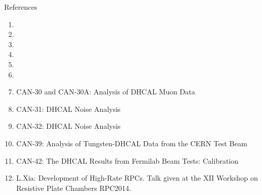 References
\begin{enumerate}
\item {}
\item {}
\item {}
\item {}
\item {}
\item {}
\item CAN-30 and CAN-30A: Analysis of DHCAL Muon Data
\item CAN-31: DHCAL Noise Analysis
\item CAN-32: DHCAL Noise Analysis
\item CAN-39: Analysis of Tungsten-DHCAL Data from the CERN Test Beam
\item CAN-42: The DHCAL Results from Fermilab Beam Tests: Calibration
\item L.Xia: Development of High-Rate RPCs. Talk given at the XII Workshop on Resistive Plate Chambers RPC2014.
\end{enumerate}
